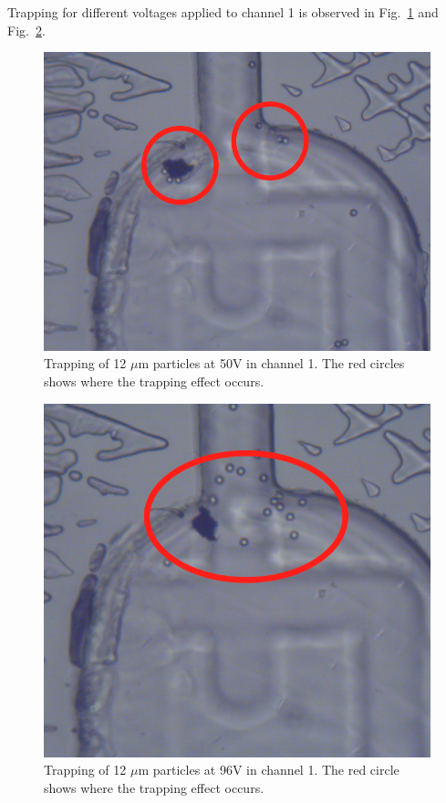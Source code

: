 \documentclass[journal, a4paper]{IEEEtran}
\begin{document}
Trapping for different voltages applied to channel 1 is observed in Fig.~\ref{fig:1-50V} and Fig.~\ref{fig:1-96V}.

\begin{figure}[!hbt]
	\begin{center}
		\includegraphics[width=\columnwidth]{1-50V.png}
		\caption{\label{fig:1-50V} Trapping of 12 $\mu$m particles at 50V in channel 1. The red circles shows where the trapping effect occurs.}
	\end{center}
\end{figure}

\begin{figure}[!hbt]
	\begin{center}
		\includegraphics[width=\columnwidth]{1-96V.png}
		\caption{\label{fig:1-96V} Trapping of 12 $\mu$m particles at 96V in channel 1. The red circle shows where the trapping effect occurs.}
	\end{center}
\end{figure}
\end{document}
